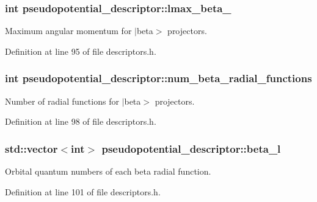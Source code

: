 \subsubsection[{lmax\+\_\+beta\+\_\+}]{\setlength{\rightskip}{0pt plus 5cm}int pseudopotential\+\_\+descriptor\+::lmax\+\_\+beta\+\_\+}\label{structpseudopotential__descriptor_ae4237a6921e6d375f23aedf4c8d523bd}


Maximum angular momentum for $\vert$beta$>$ projectors. 



Definition at line 95 of file descriptors.\+h.

\hypertarget{structpseudopotential__descriptor_a742d7a1e24c47a67de4c39872fdc42da}{}
\subsubsection[{num\+\_\+beta\+\_\+radial\+\_\+functions}]{\setlength{\rightskip}{0pt plus 5cm}int pseudopotential\+\_\+descriptor\+::num\+\_\+beta\+\_\+radial\+\_\+functions}\label{structpseudopotential__descriptor_a742d7a1e24c47a67de4c39872fdc42da}


Number of radial functions for $\vert$beta$>$ projectors. 



Definition at line 98 of file descriptors.\+h.

\hypertarget{structpseudopotential__descriptor_ae86b630c65e7b9633d0162d3e1448190}{}
\subsubsection[{beta\+\_\+l}]{\setlength{\rightskip}{0pt plus 5cm}std\+::vector$<$int$>$ pseudopotential\+\_\+descriptor\+::beta\+\_\+l}\label{structpseudopotential__descriptor_ae86b630c65e7b9633d0162d3e1448190}


Orbital quantum numbers of each beta radial function. 



Definition at line 101 of file descriptors.\+h.

